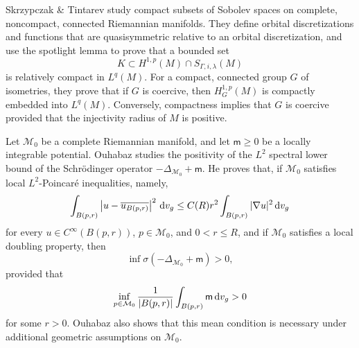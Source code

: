 \documentclass[reqno, 11pt, a4paper]{amsart}
\numberwithin{equation}{section}
\newcommand{\dvg}{\textnormal{d}v_g}
\newcommand{\pvr}{p}
\begin{document}
Skrzypczak \& Tintarev \cite{zbMATH07331136} study compact subsets of Sobolev spaces on complete, noncompact, connected Riemannian manifolds. They define orbital discretizations and functions that are quasisymmetric relative to an orbital discretization, and use the spotlight lemma to prove that a bounded set
\[
K\subset H^{1,p}(M)\cap S_{\Gamma,i,\lambda}(M)
\]
is relatively compact in \(L^q(M)\). For a compact, connected group \(G\) of isometries, they prove that if \(G\) is coercive, then \(H_G^{1,p}(M)\) is compactly embedded into \(L^q(M)\). Conversely, compactness implies that \(G\) is coercive provided that the injectivity radius of \(M\) is positive.








{ 
Let $\mathcal M_0$ be a complete Riemannian manifold, and let $\mathsf m\geq0$ be a locally integrable potential. Ouhabaz \cite{ouhabaz2001spectral} studies the positivity of the $L^2$ spectral lower bound of the Schrödinger operator $-\Delta_{\mathcal M_0}+\mathsf m$.
}
He proves that, if $\mathcal M_0$ satisfies local $L^2$-Poincaré inequalities, namely,
$$
\int_{B(\pvr,r)}\left|u-\overline{u_{B(\pvr,r)}}\right|^2\,\dvg
\leq C(R)r^2\int_{B(\pvr,r)}|\nabla u|^2\,\dvg
$$
for every $u\in C^\infty(B(\pvr,r))$, $\pvr\in\mathcal M_0$, and $0<r\leq R$, and if $\mathcal M_0$ satisfies a local doubling property, then
$$
\inf\sigma(-\Delta_{\mathcal M_0}+\mathsf m)>0,
$$
provided that
$$
\inf_{\pvr\in\mathcal M_0}\frac{1}{|B(\pvr,r)|}\int_{B(\pvr,r)}\mathsf m\,\dvg>0
$$
for some $r>0$. Ouhabaz also shows that this mean condition is necessary under additional geometric assumptions on $\mathcal M_0$.
\end{document}
